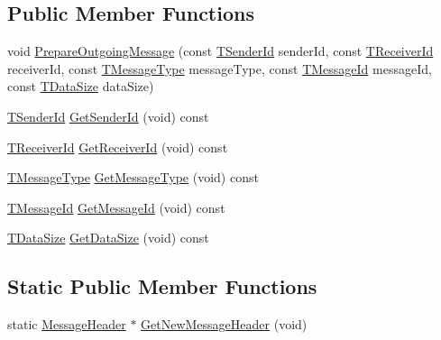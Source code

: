 \subsection*{Public Member Functions}
\begin{DoxyCompactItemize}
\item 
void \hyperlink{class_terra_swarm_1_1_message_header_a6328694eb125adbac38c7e50d5fd40e1}{Prepare\-Outgoing\-Message} (const \hyperlink{class_terra_swarm_1_1_message_header_a516b36855e2aad7cfbf8770f1b42784f}{T\-Sender\-Id} sender\-Id, const \hyperlink{class_terra_swarm_1_1_message_header_aa3260702b182b6f88ddbdd3416e98df0}{T\-Receiver\-Id} receiver\-Id, const \hyperlink{class_terra_swarm_1_1_message_header_a6eaf3733d65fa5eaac0c223da4f5670c}{T\-Message\-Type} message\-Type, const \hyperlink{class_terra_swarm_1_1_message_header_acc3ebce9679077b0e438532be7c7bf6d}{T\-Message\-Id} message\-Id, const \hyperlink{namespace_terra_swarm_a092e6ec9739175076ae3106783f5c1b6}{T\-Data\-Size} data\-Size)
\item 
\hyperlink{class_terra_swarm_1_1_message_header_a516b36855e2aad7cfbf8770f1b42784f}{T\-Sender\-Id} \hyperlink{class_terra_swarm_1_1_message_header_abd4750b2bab3760208f7016c5fe24f38}{Get\-Sender\-Id} (void) const 
\item 
\hyperlink{class_terra_swarm_1_1_message_header_aa3260702b182b6f88ddbdd3416e98df0}{T\-Receiver\-Id} \hyperlink{class_terra_swarm_1_1_message_header_a83dd1c28d2523cee08b418bda8372234}{Get\-Receiver\-Id} (void) const 
\item 
\hyperlink{class_terra_swarm_1_1_message_header_a6eaf3733d65fa5eaac0c223da4f5670c}{T\-Message\-Type} \hyperlink{class_terra_swarm_1_1_message_header_a70949a1f6ad6a41333c3a46d0166451c}{Get\-Message\-Type} (void) const 
\item 
\hyperlink{class_terra_swarm_1_1_message_header_acc3ebce9679077b0e438532be7c7bf6d}{T\-Message\-Id} \hyperlink{class_terra_swarm_1_1_message_header_a9233350f349d3de319c55ca92b3170de}{Get\-Message\-Id} (void) const 
\item 
\hyperlink{namespace_terra_swarm_a092e6ec9739175076ae3106783f5c1b6}{T\-Data\-Size} \hyperlink{class_terra_swarm_1_1_message_header_a77ce27ba8283537c9cbf3c447abbc512}{Get\-Data\-Size} (void) const 
\end{DoxyCompactItemize}
\subsection*{Static Public Member Functions}
\begin{DoxyCompactItemize}
\item 
static \hyperlink{class_terra_swarm_1_1_message_header}{Message\-Header} $\ast$ \hyperlink{class_terra_swarm_1_1_message_header_adfe790bb186f34e505d4ca699f7aa06b}{Get\-New\-Message\-Header} (void)
\end{DoxyCompactItemize}
